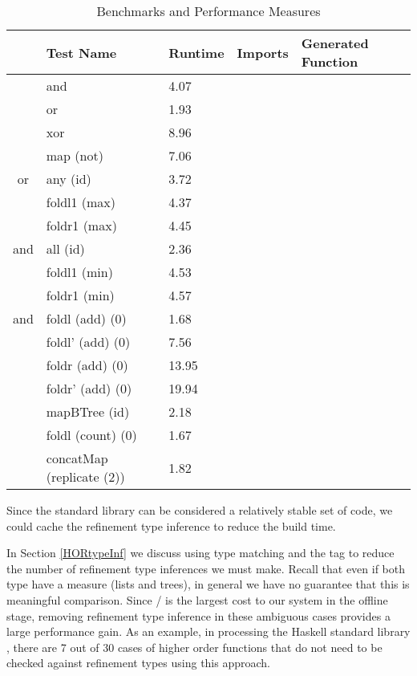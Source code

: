 \begin{table*}[t]
  \centering
  \begin{tabular}{|c|l|l|l|l|}
    \hline
    & Test Name & Runtime & Imports & Generated Function \\
    \hline
    \parbox[t]{2mm}{}
    & and & 4.07 &  &  \\
    & or  & 1.93 &  &  \\
    & xor & 8.96 &  &  \\
    \hline
    
    & map (not)        & 7.06   &  &  \\
    \hline
    
    or  & any (id)      & 3.72   &  &  \\
        & foldl1 (max)  & 4.37   &  &  \\
        & foldr1 (max)  & 4.45   &  &  \\
    \hline
    
    and & all (id)      & 2.36   &  &  \\
        & foldl1 (min)  & 4.53   &  &  \\
        & foldr1 (min)  & 4.57   &  &  \\
    \hline
    
    and & foldl  (add) (0)   & 1.68   &  &  \\
        & foldl' (add) (0)   & 7.56   &  &  \\
        & foldr  (add) (0)   & 13.95  &  &  \\
        & foldr' (add) (0)   & 19.94  &  &  \\
    \hline
    
        & mapBTree (id)      & 2.18   &  &  \\
    \hline

    & foldl (count) (0)  & 1.67   &  &  \\
    \hline

    &  concatMap (replicate (2))  & 1.82   &  &  \\
  \end{tabular}
  \caption{Benchmarks and Performance Measures}
  \label{tab:benchmarks}
\end{table*}

Since the standard library can be considered a relatively stable set of code, we could cache the refinement type inference to reduce the build time.

In Section \ref{HORtypeInf} we discuss using type matching and the  tag to reduce the number of refinement type inferences we must make. 
Recall that even if both type have a measure (lists and trees), in general we have no guarantee that this is meaningful comparison.
Since \lhask/ is the largest cost to our system in the offline stage, removing refinement type inference in these ambiguous cases provides a large performance gain.
As an example, in processing the Haskell standard library , there are 7 out of 30 cases of higher order functions that do not need to be checked against refinement types using this approach.

